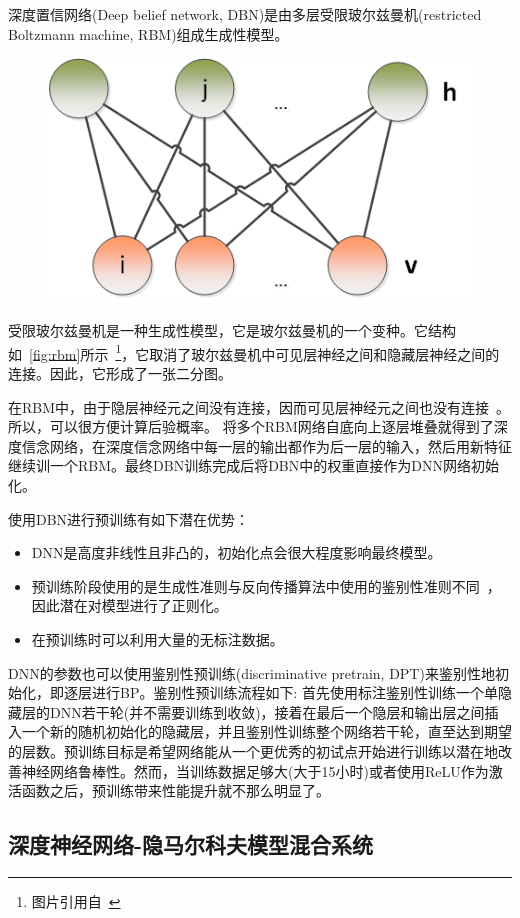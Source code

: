深度置信网络(Deep belief network, DBN)是由多层受限玻尔兹曼机(restricted Boltzmann machine, RBM)组成生成性模型。

\begin{figure}[!htp]
  \centering
    \captionstyle{\centering}
    \includegraphics[width=.5\textwidth]{figure/RBM.png}
\end{figure}

受限玻尔兹曼机是一种生成性模型，它是玻尔兹曼机的一个变种。它结构如~\ref{fig:rbm}所示~\footnote{图片引用自~\cite{ASRBook-Yu2014}}，它取消了玻尔兹曼机中可见层神经之间和隐藏层神经之间的连接。因此，它形成了一张二分图。

在RBM中，由于隐层神经元之间没有连接，因而可见层神经元之间也没有连接~\cite{yu2010roles}。所以，可以很方便计算后验概率。
将多个RBM网络自底向上逐层堆叠就得到了深度信念网络，在深度信念网络中每一层的输出都作为后一层的输入，然后用新特征继续训一个RBM。最终DBN训练完成后将DBN中的权重直接作为DNN网络初始化。

使用DBN进行预训练有如下潜在优势：
\begin{itemize}
    \item DNN是高度非线性且非凸的，初始化点会很大程度影响最终模型。
    \item 预训练阶段使用的是生成性准则与反向传播算法中使用的鉴别性准则不同~\cite{yu2010roles}，因此潜在对模型进行了正则化。
    \item 在预训练时可以利用大量的无标注数据。
\end{itemize}

DNN的参数也可以使用鉴别性预训练(discriminative pretrain, DPT)来鉴别性地初始化，即逐层进行BP。鉴别性预训练流程如下: 首先使用标注鉴别性训练一个单隐藏层的DNN若干轮(并不需要训练到收敛)，接着在最后一个隐层和输出层之间插入一个新的随机初始化的隐藏层，并且鉴别性训练整个网络若干轮，直至达到期望的层数。预训练目标是希望网络能从一个更优秀的初试点开始进行训练以潜在地改善神经网络鲁棒性。然而，当训练数据足够大(大于15小时)或者使用ReLU作为激活函数之后，预训练带来性能提升就不那么明显了。

\subsection{深度神经网络-隐马尔科夫模型混合系统}
\label{sec:dnn_hmm}

